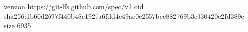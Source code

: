 version https://git-lfs.github.com/spec/v1
oid sha256:1b60d2697f440b48c1927a6fdd4e49ae0e2557bec882769b3e030420e2fd389e
size 6935

